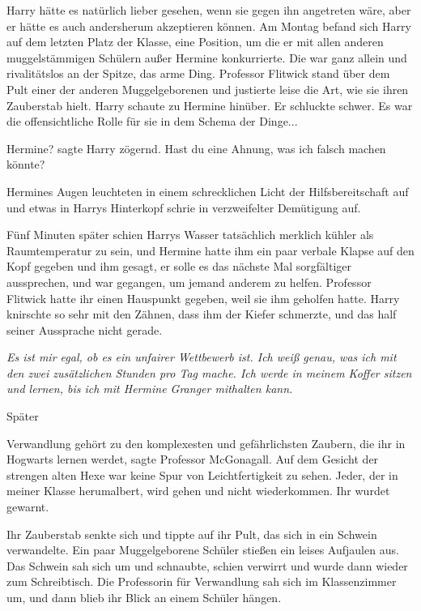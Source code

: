 Harry hätte es natürlich lieber gesehen, wenn sie gegen ihn angetreten wäre,
aber er hätte es auch andersherum akzeptieren können. Am Montag befand sich
Harry auf dem letzten Platz der Klasse, eine Position, um die er mit allen
anderen muggelstämmigen Schülern außer Hermine konkurrierte. Die war ganz allein
und rivalitätslos an der Spitze, das arme Ding. Professor Flitwick stand über
dem Pult einer der anderen Muggelgeborenen und justierte leise die Art, wie sie
ihren Zauberstab hielt. Harry schaute zu Hermine hinüber. Er schluckte schwer.
Es war die offensichtliche Rolle für sie in dem Schema der Dinge...

\glqq Hermine?\grqq{} sagte Harry zögernd. \glqq Hast du eine Ahnung, was ich
falsch machen könnte?\grqq{}

Hermines Augen leuchteten in einem schrecklichen Licht der Hilfsbereitschaft auf
und etwas in Harrys Hinterkopf schrie in verzweifelter Demütigung auf.

Fünf Minuten später schien Harrys Wasser tatsächlich merklich kühler als
Raumtemperatur zu sein, und Hermine hatte ihm ein paar verbale Klapse auf den
Kopf gegeben und ihm gesagt, er solle es das nächste Mal sorgfältiger
aussprechen, und war gegangen, um jemand anderem zu helfen. Professor Flitwick
hatte ihr einen Hauspunkt gegeben, weil sie ihm geholfen hatte. Harry knirschte
so sehr mit den Zähnen, dass ihm der Kiefer schmerzte, und das half seiner
Aussprache nicht gerade.

\emph{Es ist mir egal, ob es ein unfairer Wettbewerb ist. Ich weiß genau, was
ich mit den zwei zusätzlichen Stunden pro Tag mache. Ich werde in meinem Koffer
sitzen und lernen, bis ich mit Hermine Granger mithalten kann. }

Später

\glqq Verwandlung gehört zu den komplexesten und gefährlichsten Zaubern, die ihr
in Hogwarts lernen werdet\grqq{}, sagte Professor McGonagall. Auf dem Gesicht
der strengen alten Hexe war keine Spur von Leichtfertigkeit zu sehen. \glqq
Jeder, der in meiner Klasse herumalbert, wird gehen und nicht wiederkommen. Ihr
wurdet gewarnt.\grqq{}

Ihr Zauberstab senkte sich und tippte auf ihr Pult, das sich in ein Schwein
verwandelte. Ein paar Muggelgeborene Schüler stießen ein leises Aufjaulen aus.
Das Schwein sah sich um und schnaubte, schien verwirrt und wurde dann wieder zum
Schreibtisch. Die Professorin für Verwandlung sah sich im Klassenzimmer um, und
dann blieb ihr Blick an einem Schüler hängen.

